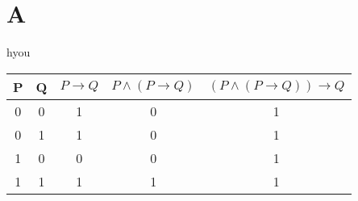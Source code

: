 \documentclass[b5paper]{jarticle}
\begin{document}
	\section{A}
	\begin{center}
			\begin{itembox}[l]{hyou}
				\begin{center}
		\begin{tabular}{|c|c||c|c|c|} \hline
		P & Q & \(P \to Q\) & \(P \land (P \to Q)\) & \((P \land (P \to Q)) \to Q\) \\ \hline
		0 & 0 &           1 &                      0 &                              1 \\ \hline
		0 & 1 &           1 &                      0 &                              1 \\ \hline \hline
		1 & 0 &           0 &                      0 &                              1 \\ \hline \hline
		1 & 1 & 	  1 &                      1 &                              1 \\ \hline
		\end{tabular}

				\end{center}	
			\end{itembox}
	\end{center}
\end{document}
